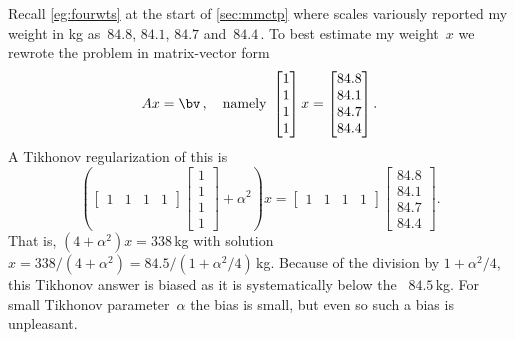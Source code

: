 \begin{example} 
Recall \cref{eg:fourwts} at the start of \cref{sec:mmctp} where  scales variously reported my weight in kg as~\(84.8\), \(84.1\), \(84.7\) and~\(84.4\)\,.  
To best estimate my weight~\(x\) we rewrote the problem in matrix-vector form
\begin{equation*}
Ax=\bv\,,\quad\text{namely }
\begin{bmatrix} 1\\1\\1\\1 \end{bmatrix}x
=\begin{bmatrix} 84.8\\84.1\\84.7\\84.4 \end{bmatrix}.
\end{equation*}
A Tikhonov regularization of this  is
\begin{equation*}
\left(\begin{bmatrix} 1&1&1&1 \end{bmatrix}\begin{bmatrix} 1\\1\\1\\1 \end{bmatrix}+\alpha^2\right)x
=\begin{bmatrix} 1&1&1&1 \end{bmatrix}\begin{bmatrix} 84.8\\84.1\\84.7\\84.4 \end{bmatrix}.
\end{equation*}
That is, \((4+\alpha^2)x=338\)\,kg with solution \(x=338/(4+\alpha^2)=84.5/(1+\alpha^2/4)\)\,kg.
Because of the division by \(1+\alpha^2/4\), this Tikhonov answer is biased as it is systematically below the ~\(84.5\)\,kg.
For small Tikhonov parameter~\(\alpha\) the bias is small, but even so such a bias is unpleasant.
\end{example}



